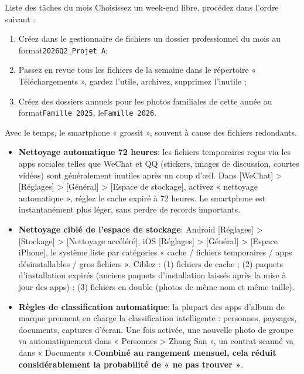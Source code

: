 \begin{tcbpractice}{Liste des tâches du mois}
Choisissez un week-end libre, procédez dans l'ordre suivant :

\begin{enumerate}
  \item Créez dans le gestionnaire de fichiers un dossier professionnel du mois au format\texttt{2026Q2\_Projet A};
  \item Passez en revue tous les fichiers de la semaine dans le répertoire « Téléchargements », gardez l'utile, archivez, supprimez l'inutile ;
  \item Créez des dossiers annuels pour les photos familiales de cette année au format\texttt{Famille 2025}, le\texttt{Famille 2026}.
\end{enumerate}

\end{tcbpractice}


Avec le temps, le smartphone « grossit », souvent à cause des fichiers redondants.

\begin{itemize}
  \item \textbf{Nettoyage automatique 72 heures}: les fichiers temporaires reçus via les apps sociales telles que WeChat et QQ (stickers, images de discussion, courtes vidéos) sont généralement inutiles après un coup d'œil. Dans [WeChat] > [Réglages] > [Général] > [Espace de stockage], activez « nettoyage automatique », réglez le cache expiré à 72 heures. Le smartphone est instantanément plus léger, sans perdre de records importants.
  \item \textbf{Nettoyage ciblé de l'espace de stockage}: Android [Réglages] > [Stockage] > [Nettoyage accéléré], iOS [Réglages] > [Général] > [Espace iPhone], le système liste par catégories « cache / fichiers temporaires / apps désinstallables / gros fichiers ». Ciblez : (1) fichiers de cache ; (2) paquets d'installation expirés (anciens paquets d'installation laissés après la mise à jour des apps) ; (3) fichiers en double (photos de même nom et même taille).
  \item \textbf{Règles de classification automatique}: la plupart des apps d'album de marque prennent en charge la classification intelligente : personnes, paysages, documents, captures d'écran. Une fois activée, une nouvelle photo de groupe va automatiquement dans « Personnes > Zhang San », un contrat scanné va dans « Documents ».\textbf{Combiné au rangement mensuel, cela réduit considérablement la probabilité de « ne pas trouver »}.
\end{itemize}

